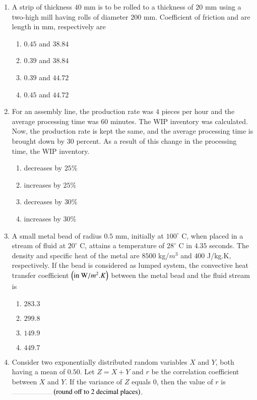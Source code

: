 \documentclass[journal,12pt,onecolumn]{IEEEtran}
\theoremstyle{remark}
\begin{document}
\begin{enumerate}[start=27]
\item A strip of thickness $40$ mm is to be rolled to a thickness of $20$ mm using a two-high mill having rolls of diameter $200$ mm. Coefficient of friction and are length in mm, respectively are
\hfill{}
\begin{enumerate}
\item $0.45$ and $38.84$
\item $0.39$ and $38.84$
\item $0.39$ and $44.72$
\item $0.45$ and $44.72$
\end{enumerate}

\item For an assembly line, the production rate was $4$ pieces per hour and the average processing time was $60$ minutes. The WIP inventory was calculated. Now, the production rate is kept the same, and the average processing time is brought down by $30$ percent. As a result of this change in the processing time, the WIP inventory.
\hfill{}
\begin{enumerate}
\item decreases by $25\%$
\item increases by $25\%$
\item decreases by $30\%$
\item increases by $30\%$
\end{enumerate}

\item A small metal bead of radius $0.5$ mm, initially at $100^\circ$ C, when placed in a stream of fluid at $20^\circ$ C, attains a temperature of $28^\circ$ C in $4.35$ seconds. The density and specific heat of the metal are $8500$ kg/$m^3$ and $400$ J/kg.K, respectively. If the bead is considered as lumped system, the convective heat transfer coefficient $\left(\text{in W}/m^2 .K\right)$ between the metal bead and the fluid stream is
\hfill{}
\begin{enumerate}
\item $283.3$
\item $299.8$
\item $149.9$
\item $449.7$
\end{enumerate}

\item Consider two exponentially distributed random variables $X$ and $Y$, both having a mean of $0.50$. Let $Z=X+Y$ and $r$ be the correlation coefficient between $X$ and $Y$. If the variance of $Z$ equals $0$, then the value of $r$ is $\rule{2cm}{0.1pt}\brak{\text{round off to 2 decimal places}}$.
\hfill{}


\end{enumerate}
\end{document}
